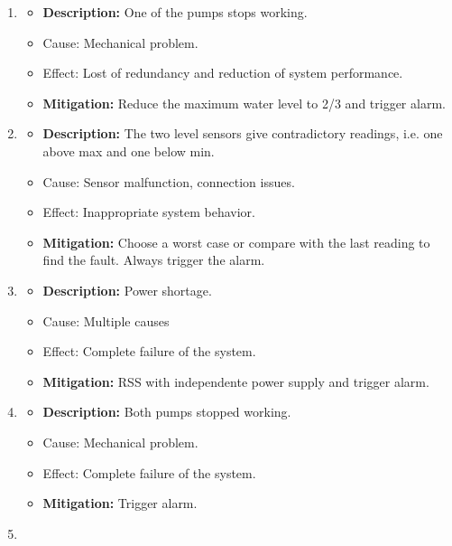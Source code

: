 \documentclass[11pt]{article}
\begin{document}
\begin{enumerate}[leftmargin=4em, font=\small, label=\textbf{H-\arabic*:}]
	\setlength\itemsep{.5em}
	\item 
		\begin{itemize}
		\setlength\itemsep{0em}
        		\item \textbf{Description:} One of the pumps stops working.
		\item Cause: Mechanical problem.
    		\item Effect: Lost of redundancy and reduction of system performance.
    		\item \textbf{Mitigation:} Reduce the maximum water level to 2/3 and trigger alarm.
		\end{itemize}
	\item 
		\begin{itemize}
		\setlength\itemsep{0em}
    		\item \textbf{Description:} The two level sensors give contradictory readings, i.e. one above max and one below min.
		\item Cause: Sensor malfunction, connection issues.
    		\item Effect: Inappropriate system behavior. 
    		\item \textbf{Mitigation:} Choose a worst case or compare with the last reading to find the fault. Always trigger the alarm.
		\end{itemize}
	\item 
		\begin{itemize}
		\setlength\itemsep{0em}
    		\item \textbf{Description:} Power shortage.
		\item Cause: Multiple causes
    		\item Effect: Complete failure of the system.
    		\item \textbf{Mitigation:} RSS with independente power supply and trigger alarm.
		\end{itemize} 
	\item 
		\begin{itemize}
		\setlength\itemsep{0em}
    		\item \textbf{Description:} Both pumps stopped working.
		\item Cause: Mechanical problem.
    		\item Effect: Complete failure of the system.
    		\item \textbf{Mitigation:} Trigger alarm.
		\end{itemize} 
	\item 

\end{enumerate}
\end{document}
